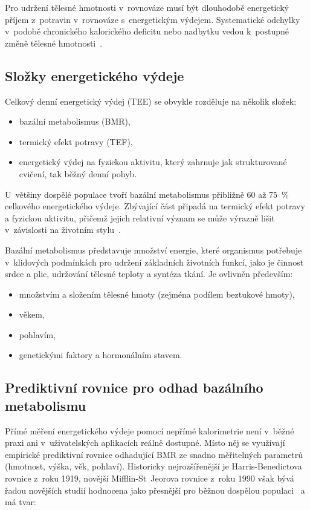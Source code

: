 Pro udržení tělesné hmotnosti v~rovnováze musí být dlouhodobě energetický příjem z~potravin v~rovnováze s~energetickým výdejem.
Systematické odchylky v~podobě chronického kalorického deficitu nebo nadbytku vedou k~postupné změně tělesné hmotnosti~\cite{theodorakis2025humanEnergyBalance}.

\subsection{Složky energetického výdeje}
\label{subsec:slozkyVydeje}

Celkový denní energetický výdej (TEE) se obvykle rozděluje na několik složek:

\begin{itemize}
	\item bazální metabolismus (BMR),
	\item termický efekt potravy (TEF),
	\item energetický výdej na fyzickou aktivitu, který zahrnuje jak strukturované cvičení, tak běžný denní pohyb.
\end{itemize}

U~většiny dospělé populace tvoří bazální metabolismus přibližně 60 až 75~\% celkového energetického výdeje.
Zbývající část připadá na termický efekt potravy a fyzickou aktivitu, přičemž jejich relativní význam se může výrazně lišit v~závislosti na životním stylu~\cite{theodorakis2025humanEnergyBalance}.

Bazální metabolismus představuje množství energie, které organismus potřebuje v~klidových podmínkách pro udržení základních životních funkcí, jako je činnost srdce a plic, udržování tělesné teploty a syntéza tkání.
Je ovlivněn především:

\begin{itemize}
	\item množstvím a složením tělesné hmoty (zejména podílem beztukové hmoty),
	\item věkem,
	\item pohlavím,
	\item genetickými faktory a hormonálním stavem.
\end{itemize}

\subsection{Prediktivní rovnice pro odhad bazálního metabolismu}
\label{subsec:bmrRovnice}

Přímé měření energetického výdeje pomocí nepřímé kalorimetrie není v~běžné praxi ani v~uživatelských aplikacích reálně dostupné.
Místo něj se využívají empirické prediktivní rovnice odhadující BMR ze snadno měřitelných parametrů (hmotnost, výška, věk, pohlaví).
Historicky nejrozšířenější je Harris-Benedictova rovnice z~roku 1919, novější Mifflin-St~Jeorova rovnice z~roku 1990 však bývá řadou novějších studií hodnocena jako přesnější pro běžnou dospělou populaci~\cite{frankenfield2005comparison} a má tvar:

